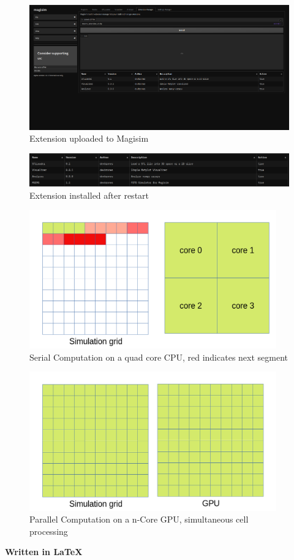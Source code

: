 \documentclass[11pt, a4paper, titlepage]{article}
\begin{document}
\newpage
\begin{figure}[h]
	\includegraphics[width=\textwidth]{magisim-screenshot-0010.png}
	\caption{Extension uploaded to Magisim}
	\label{fig:exuplsucc}
\end{figure}
\begin{figure}[h]
	\includegraphics[width=\textwidth]{magisim-screenshot-0011.png}
	\caption{Extension installed after restart}
	\label{fig:exvisreb}
\end{figure}
\newpage
\begin{figure}[h]
	\includegraphics[width=0.95\textwidth]{simserial.png}
	\caption{Serial Computation on a quad core CPU, red indicates next segment}
	\label{fig:serialsim}
\end{figure}
\begin{figure}[h]
	\includegraphics[width=0.95\textwidth]{simpar.png}
	\caption{Parallel Computation on a n-Core GPU, simultaneous cell processing}
	\label{fig:parsim}
\end{figure}
\newpage


\begin{center}
	\large\textbf{Written in \LaTeX}
\end{center}
\end{document}
